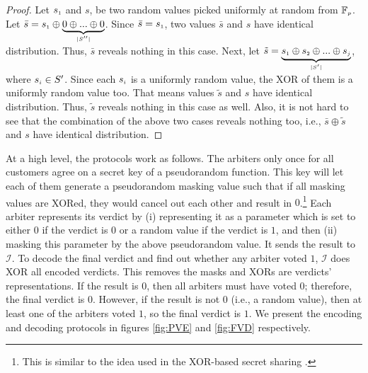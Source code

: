 \begin{proof}
Let $s_{\scriptscriptstyle 1}$ and $s$, be two random values picked uniformly at random from $\mathbb{F}_{\scriptscriptstyle p}$. Let $\bar s=s_{\scriptscriptstyle 1}\oplus \underbrace{0\oplus... \oplus 0}_{\scriptscriptstyle |S''|}$. Since  $\bar s=s_{\scriptscriptstyle 1}$, two values $\bar s$ and $s$ have identical distribution. Thus, $\bar s$ reveals nothing in this case. Next, let $\tilde s=\underbrace{ s_{\scriptscriptstyle 1}\oplus s_{\scriptscriptstyle 2}\oplus... \oplus s_{\scriptscriptstyle j}}_{\scriptscriptstyle |S'|}$, where $s_{\scriptscriptstyle i}\in S'$. Since each $s_{\scriptscriptstyle i}$ is a uniformly random value,  the XOR of them is a uniformly random value too. That means values $\tilde s$ and $s$ have identical distribution. Thus, $\tilde s$ reveals nothing in this case as well. Also, it is not hard to see that the combination of the above two cases reveals nothing too, i.e., $\bar s\oplus \tilde s$ and $s$ have    identical distribution. 
%
\end{proof}


At a high level, the protocols work as follows.  The arbiters only once for all customers agree on a secret key of a pseudorandom function. This key will let each of them   generate a pseudorandom masking value such that if all masking values are XORed, they would cancel out each other and result in $0$.\footnote{This is similar to the idea used in the XOR-based secret sharing \cite{Schneier0078909}.} Each arbiter represents its verdict by (i) representing it as a parameter which is set to either $0$ if the verdict is $0$ or a random value if the verdict is $1$, and then (ii) masking this parameter by the above  pseudorandom value.  It sends the result to $\mathcal{I}$.  To decode the final verdict and find out whether any arbiter voted $1$, $\mathcal{I}$  does XOR all encoded verdicts. This removes the masks and XORs are verdicts' representations.  If the result is $0$, then    all arbiters must have voted $0$; therefore,  the final verdict is $0$. However, if the result is not $0$ (i.e., a random value), then at least one of the arbiters voted $1$, so  the final verdict is $1$. We present the encoding  and decoding protocols in figures \ref{fig:PVE} and \ref{fig:FVD} respectively.
 
